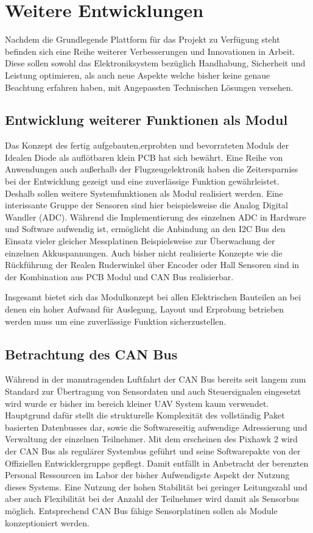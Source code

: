 \chapter{Weitere Entwicklungen}\label{cha:Weitere Entwicklungen}

Nachdem die Grundlegende Plattform für das Projekt zu Verfügung steht befinden sich eine Reihe weiterer Verbesserungen und Innovationen in Arbeit. Diese sollen sowohl das Elektroniksystem bezüglich Handhabung, Sicherheit und Leistung optimieren, als auch neue Aspekte welche bisher keine genaue Beachtung erfahren haben, mit Angepassten Technischen Lösungen versehen.


\section{Entwicklung weiterer Funktionen als Modul}

Das Konzept des fertig aufgebauten,erprobten und bevorrateten Moduls der Idealen Diode als auflötbaren klein PCB hat sich bewährt. Eine Reihe von Anwendungen auch außerhalb der Flugzeugelektronik haben die Zeitersparniss bei der Entwicklung gezeigt und eine zuverlässige Funktion gewährleistet.
Deshalb sollen weitere Systemfunktionen als Modul realisiert werden.
Eine interissante Gruppe der Sensoren sind hier beispielsweise die Analog Digital Wandler (ADC). Während die Implementierung des einzelnen ADC in Hardware und Software aufwendig ist, ermöglicht die Anbindung an den I2C Bus den Einsatz vieler gleicher Messplatinen Beispielsweise zur Überwachung der einzelnen Akkuspannungen.
Auch bisher nicht realisierte Konzepte wie die Rückführung der Realen Ruderwinkel über Encoder oder Hall Sensoren sind in der Kombination aus PCB Modul und CAN Bus realisierbar.

Insgesamt bietet sich das Modulkonzept bei allen Elektrischen Bauteilen an bei denen ein hoher Aufwand für Auslegung, Layout und Erprobung betrieben werden muss um eine zuverlässige Funktion sicherzustellen.

\section{Betrachtung des CAN Bus}

Während in der manntragenden Luftfahrt der CAN Bus bereits seit langem zum Standard zur Übertragung von Sensordaten und auch Steuersignalen eingesetzt wird wurde er bisher im bereich kleiner UAV System kaum verwendet. Hauptgrund dafür stellt die strukturelle  Komplexität des vollständig Paket basierten Datenbusses dar, sowie die Softwareseitig aufwendige Adressierung und Verwaltung der einzelnen Teilnehmer.
Mit dem erscheinen des Pixhawk 2 wird der CAN Bus als regulärer Systembus geführt und seine Softwarepakte von der Offiziellen Entwicklergruppe gepflegt. Damit entfällt in Anbetracht der berenzten Personal Ressourcen im Labor der bisher Aufwendigste Aspekt der Nutzung dieses Systems. Eine Nutzung der hohen Stabilität bei geringer Leitungszahl und aber auch Flexibilität bei der Anzahl der Teilnehmer wird damit als Sensorbus möglich.
Entsprechend CAN Bus fähige Sensorplatinen sollen als Module konzeptioniert werden.

